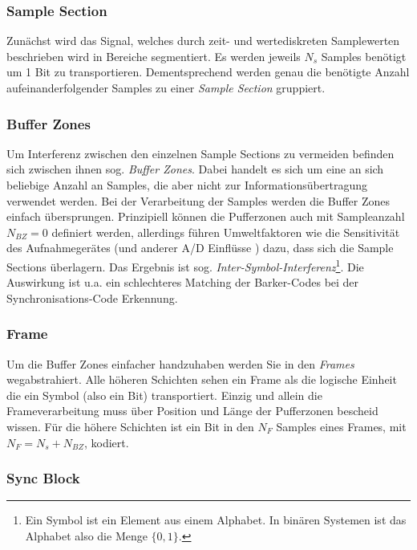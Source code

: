 \subsubsection{Sample Section}

Zunächst wird das Signal, welches durch zeit- und wertediskreten Samplewerten beschrieben wird in Bereiche segmentiert. Es werden jeweils $N_s$ Samples benötigt um 1 Bit zu transportieren. Dementsprechend werden genau die benötigte Anzahl aufeinanderfolgender Samples zu einer \textit{Sample Section} gruppiert.  

\subsubsection{Buffer Zones}

Um Interferenz zwischen den einzelnen Sample Sections zu vermeiden befinden sich zwischen ihnen sog. \textit{Buffer Zones}. Dabei handelt es sich um eine an sich beliebige Anzahl an Samples, die aber nicht zur Informationsübertragung verwendet werden. Bei der Verarbeitung der Samples werden die Buffer Zones einfach übersprungen. Prinzipiell können die Pufferzonen auch mit Sampleanzahl ${N}_{BZ} = 0$ definiert werden, allerdings führen Umweltfaktoren wie die Sensitivität des Aufnahmegerätes (und anderer A/D Einflüsse ) dazu, dass sich die Sample Sections überlagern\cite{chang2012location}. Das Ergebnis ist sog. \textit{Inter-Symbol-Interferenz}\footnote{Ein Symbol ist ein Element aus einem Alphabet. In binären Systemen ist das Alphabet also die Menge $\{0,1\}$.}. Die Auswirkung ist u.a. ein schlechteres Matching der Barker-Codes bei der Synchronisations-Code Erkennung.

\subsubsection{Frame}

Um die Buffer Zones einfacher handzuhaben werden Sie in den \textit{Frames} wegabstrahiert. Alle höheren Schichten sehen ein Frame als die logische Einheit die ein Symbol (also ein Bit) transportiert. Einzig und allein die Frameverarbeitung muss über Position und Länge der Pufferzonen bescheid wissen. Für die höhere Schichten ist ein Bit in den ${N}_{F}$ Samples eines Frames, mit ${N}_{F} = {N}_{s} + {N}_{BZ}$, kodiert.

\subsubsection{Sync Block}

